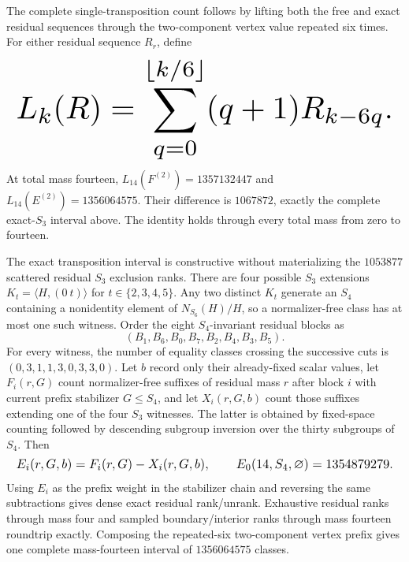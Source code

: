 \documentclass{article}
\newcommand{\fitmath}[1]{\resizebox{0.99\linewidth}{!}{$\displaystyle #1$}}
\begin{document}
The complete single-transposition count follows by lifting both the free and
exact residual sequences through the two-component vertex value repeated six
times. For either residual sequence $R_r$, define
\begin{equation}
  \fitmath{%
    L_k(R)=\sum_{q=0}^{\lfloor k/6\rfloor}(q+1)R_{k-6q}.
  }
  \label{eq:optimization-crazy-sextuple-s6-full-transposition-outer}
\end{equation}
At total mass fourteen,
$L_{14}(F^{(2)})=1357132447$ and
$L_{14}(E^{(2)})=1356064575$. Their difference is $1067872$, exactly the
complete exact-$S_3$ interval above. The identity holds through every total
mass from zero to fourteen.

The exact transposition interval is constructive without materializing the
$1053877$ scattered residual $S_3$ exclusion ranks. There are four possible
$S_3$ extensions $K_t=\langle H,(0\ t)\rangle$ for $t\in\{2,3,4,5\}$. Any two
distinct $K_t$ generate an $S_4$ containing a nonidentity element of
$N_{S_6}(H)/H$, so a normalizer-free class has at most one such witness. Order
the eight $S_4$-invariant residual blocks as
\[
  (B_1,B_6,B_0,B_7,B_2,B_4,B_3,B_5).
\]
For every witness, the number of equality classes crossing the successive cuts
is $(0,3,1,1,3,0,3,3,0)$. Let $b$ record only their already-fixed scalar values,
let $F_i(r,G)$ count normalizer-free suffixes of residual mass $r$ after block
$i$ with current prefix stabilizer $G\leq S_4$, and let $X_i(r,G,b)$ count those
suffixes extending one of the four $S_3$ witnesses. The latter is obtained by
fixed-space counting followed by descending subgroup inversion over the thirty
subgroups of $S_4$. Then
\begin{equation}
  \fitmath{%
    E_i(r,G,b)=F_i(r,G)-X_i(r,G,b),
    \qquad
    E_0(14,S_4,\varnothing)=1354879279.
  }
  \label{eq:optimization-crazy-sextuple-s6-full-transposition-exact-ranking}
\end{equation}
Using $E_i$ as the prefix weight in the stabilizer chain and reversing the same
subtractions gives dense exact residual rank/unrank. Exhaustive residual ranks
through mass four and sampled boundary/interior ranks through mass fourteen
roundtrip exactly. Composing the repeated-six two-component vertex prefix gives
one complete mass-fourteen interval of $1356064575$ classes.
\end{document}
